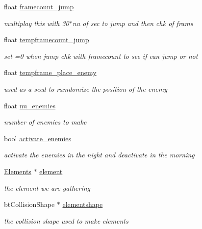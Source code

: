 \begin{DoxyCompactItemize}
float \hyperlink{classoctet_1_1minecraft__wars_a3b1687fe91e29d83e0c854b7ff101104}{framecount\+\_\+jump}
\begin{DoxyCompactList}\small\item\em multiplay this with 30$\ast$nu of sec to jump and then chk of frams \end{DoxyCompactList}\item 
float \hyperlink{classoctet_1_1minecraft__wars_aa931e9fbabfd6f4e34be1d347c0f3243}{tempframecount\+\_\+jump}
\begin{DoxyCompactList}\small\item\em set =0 when jump chk with framecount to see if can jump or not \end{DoxyCompactList}\item 
float \hyperlink{classoctet_1_1minecraft__wars_aad3088aab37dfa4958679db1811faa5a}{tempframe\+\_\+place\+\_\+enemy}
\begin{DoxyCompactList}\small\item\em used as a seed to ramdomize the position of the enemy \end{DoxyCompactList}\item 
float \hyperlink{classoctet_1_1minecraft__wars_ac51eb660e901c04fe7d3b7803d32323e}{nu\+\_\+enemies}
\begin{DoxyCompactList}\small\item\em number of enemies to make \end{DoxyCompactList}\item 
bool \hyperlink{classoctet_1_1minecraft__wars_ae0d291f49dc8f23c1bab8d1bc53b2c5d}{activate\+\_\+enemies}
\begin{DoxyCompactList}\small\item\em activate the enemies in the night and deactivate in the morning \end{DoxyCompactList}\item 
\hyperlink{structoctet_1_1_elements}{Elements} $\ast$ \hyperlink{classoctet_1_1minecraft__wars_a2737ea29048537da921679cd2c0d1885}{element}
\begin{DoxyCompactList}\small\item\em the element we are gathering \end{DoxyCompactList}\item 
bt\+Collision\+Shape $\ast$ \hyperlink{classoctet_1_1minecraft__wars_a76be6b7555e4fed213a4846bde7d3ba0}{elementshape}
\begin{DoxyCompactList}\small\item\em the collision shape used to make elements \end{DoxyCompactList}\item 

\end{DoxyCompactItemize}
